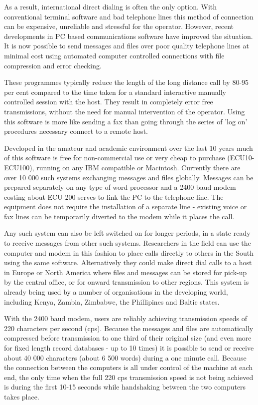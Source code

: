 As a result, international direct dialing is often the only option. With
conventional terminal software and bad telephone lines this method of
connection can be expensive, unreliable and stressful for the operator.
However, recent developments in PC based communications software have
improved the situation. It is now possible to send messages and files over
poor quality telephone lines at minimal cost using automated computer
controlled connections with file compression and error checking.

These programmes typically reduce the length of the long distance call by
80-95 per cent compared to the time taken for a standard interactive manually
controlled session with the host. They result in completely error free
transmissions, without the need for manual intervention of the operator.
Using this software is more like sending a fax than going through the
series of 'log on' procedures necessary connect to a remote host.

Developed in the amateur and academic environment over the last 10 years
much of this software is free for non-commercial use or very cheap to
purchase (ECU10-ECU100), running on any IBM compatible or Macintosh. Currently
there are over 10 000 such systems exchanging messages and files globally.
Messages can be prepared separately on any type of word processor and a
2400 baud modem costing about ECU 200 serves to link the PC to the
telephone line. The equipment does not require the installation of a
separate line - existing voice or fax lines can be temporarily diverted to
the modem while it places the call.

Any such system can also be left switched on for longer periods, in a state
ready to  receive messages from other such systems. Researchers in the
field can use the computer and modem in this fashion to place calls
directly to others in the South using the same software. Alternatively they
could make direct dial calls to a host in Europe or North America where
files and messages can be stored for pick-up by the central office, or for
onward transmission to other regions. This system is already being used by
a number of organisations in the developing world, including Kenya, Zambia,
Zimbabwe, the Phillipines and Baltic states.

With the 2400 baud modem, users are reliably achieving transmission speeds
of 220 characters per second (cps). Because the messages and files are
automatically compressed before transmission to one third of their original
size (and even more for fixed length record databases - up to 10 times) it
is possible to send or receive about 40 000 characters (about 6 500 words)
during a one minute call. Because the connection between the computers is
all under control of the machine at each end, the only time when the full
220 cps transmission speed is not being achieved is during the first 10-15
seconds while handshaking between the two computers takes place.

